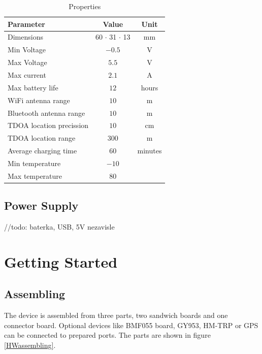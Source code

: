 \begin{table}[H]
	\centering
	\begin{tabular}{|l|c|c|}
		\hline
		Parameter & Value & Unit \\
		\hline \hline
		Dimensions & 60 $\cdot$ 31 $\cdot$ 13 & mm \\
		Min Voltage & $-0.5$ & V \\
		Max Voltage & $5.5$ & V \\
		Max current & $2.1$ & A \\
		Max battery life & $12$ & hours \\
		WiFi antenna range & $10$ & m \\
		Bluetooth antenna range & $10$ & m \\
		TDOA location precission & $10$ & cm \\
		TDOA location range & $300$ & m \\
		Average charging time & $60$ & minutes \\
		Min temperature & $-10$ & \degreeCelsius \\
		Max temperature & $80$ & \degreeCelsius \\
		\hline
	\end{tabular}
	\caption{Properties}
	\label{HWmaxRatings}
\end{table}

\subsection{Power Supply}
//todo: baterka, USB, 5V nezavisle

\section{Getting Started}

\subsection{Assembling}
The device is assembled from three parts, two sandwich boards and one connector board. Optional devices like BMF055 board, GY953, HM-TRP or GPS can be connected to prepared ports. The parts are shown in figure \ref{HWassembling}.

